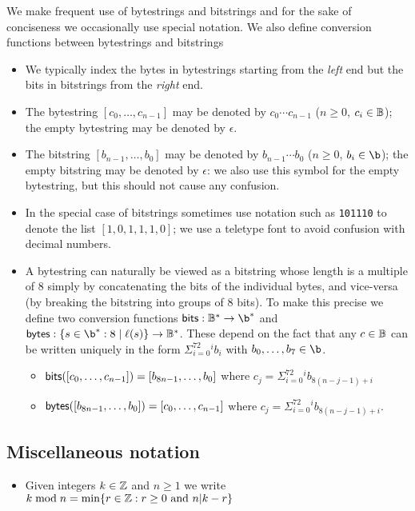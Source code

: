 We make frequent use of bytestrings and bitstrings and for the sake of
conciseness we occasionally use special notation.  We also define conversion
functions between bytestrings and bitstrings

\begin{itemize}
\item We typically index the bytes in bytestrings starting from the
  \textit{left} end but the bits in bitstrings from the \textit{right} end.

\item The bytestring $[c_0, \ldots, c_{n-1}]$ may be denoted by
  $c_0{\cdots}c_{n-1}$ ($n \geq 0$, $c_i \in \mathbb{B}$); the empty bytestring may be
  denoted by $\epsilon$.

\item The  bitstring $[b_{n-1}, \ldots, b_0]$ may be denoted by
  $b_{n-1}{\cdots}b_0$ ($n \geq 0$, $b_i \in \b$); the empty bitstring may be
  denoted by $\epsilon$: we also use this symbol for the empty bytestring, but
  this should not cause any confusion.

\item In the special case of bitstrings sometimes use notation such as
  \texttt{101110} to denote the list $[1,0,1,1,1,0]$; we use a teletype font to
  avoid confusion with decimal numbers.

\item A bytestring can naturally be viewed as a bitstring whose length is a
  multiple of 8 simply by concatenating the bits of the individual bytes, and
  vice-versa (by breaking the bitstring into groups of 8 bits).  To make this
  precise we define two conversion functions $\bitsof: \B^* \rightarrow \b^*$
  and $\bytesof: \{s \in \b^* : 8 \mid \length(s)\} \rightarrow \B^*$.  These
  depend on the fact that any $c \in \mathbb{B}$ can be written uniquely in the form
  $\Sigma_{i=0}^72^ib_i$ with $b_0, \ldots, b_7 \in \b$.
  \begin{itemize}
    \item $\mathsf{bits}([c_0, \ldots, c_{n-1}]) = [b_{8n-1}, \ldots, b_0]$ where $c_j=\Sigma_{i=0}^72^ib_{8(n-j-1)+i}$
    \item $\mathsf{bytes}([b_{8n-1}, \ldots, b_0]) = [c_0, \ldots, c_{n-1}]$ where $c_j=\Sigma_{i=0}^72^ib_{8(n-j-1)+i}$.
  \end{itemize}
\end{itemize}

\subsection{Miscellaneous notation}
\begin{itemize}
\item Given integers $k \in \mathbb{Z}$ and $n \geq 1$ we write $k \bmod n = \min\{r \in \mathbb{Z}: r \geq 0 \text{ and } n | k - r \}$
\end{itemize}


